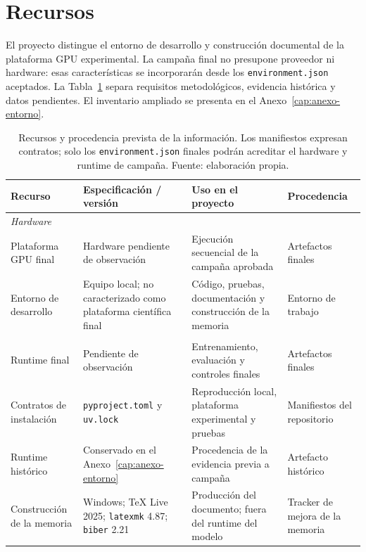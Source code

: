 \section{Recursos}
El proyecto distingue el entorno de desarrollo y construcción documental de la plataforma GPU experimental. La campaña final no presupone proveedor ni hardware: esas características se incorporarán desde los \texttt{environment.json} aceptados. La Tabla~\ref{tab:recursos} separa requisitos metodológicos, evidencia histórica y datos pendientes. El inventario ampliado se presenta en el Anexo~\ref{cap:anexo-entorno}.

\begin{table}[htbp]
\centering
\footnotesize
\begin{tabular}{@{}p{2.1cm}p{3.3cm}p{4.4cm}p{2.7cm}@{}}
\toprule
\textbf{Recurso} & \textbf{Especificación / versión} & \textbf{Uso en el proyecto} & \textbf{Procedencia} \\
\midrule
\multicolumn{4}{l}{\textit{Hardware}} \\
\addlinespace
Plataforma GPU final & Hardware pendiente de observación & Ejecución secuencial de la campaña aprobada & Artefactos finales \\
Entorno de desarrollo & Equipo local; no caracterizado como plataforma científica final & Código, pruebas, documentación y construcción de la memoria & Entorno de trabajo \\
\addlinespace
\multicolumn{4}{l}{\textit{Software}} \\
\addlinespace
Runtime final & Pendiente de observación & Entrenamiento, evaluación y controles finales & Artefactos finales \\
Contratos de instalación & \texttt{pyproject.toml} y \texttt{uv.lock} & Reproducción local, plataforma experimental y pruebas & Manifiestos del repositorio \\
Runtime histórico & Conservado en el Anexo~\ref{cap:anexo-entorno} & Procedencia de la evidencia previa a campaña & Artefacto histórico \\
Construcción de la memoria & Windows; TeX Live 2025; \texttt{latexmk} 4.87; \texttt{biber} 2.21 & Producción del documento; fuera del runtime del modelo & Tracker de mejora de la memoria \\
\bottomrule
\end{tabular}
\caption[Recursos hardware y software del proyecto]{Recursos y procedencia prevista de la información. Los manifiestos expresan contratos; solo los \texttt{environment.json} finales podrán acreditar el hardware y runtime de campaña. Fuente: elaboración propia.}
\label{tab:recursos}
\end{table}

